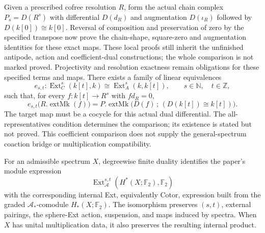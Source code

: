\begin{theorem}
  \label{thm:milnor-coefficient-module-comparison}
  Given a prescribed cofree resolution $R$, form the actual chain complex
  $P_s=D(R^s)$ with differential $D(d_R)$ and augmentation $D(\iota_R)$
  followed by $D(k[0])\cong k[0]$. Reversal of composition and preservation
  of zero by the specified transpose now prove the chain-shape, square-zero
  and augmentation identities for these exact maps. These local proofs still
  inherit the unfinished antipode, action and coefficient-dual constructions;
  the whole comparison is not marked proved. Projectivity and resolution
  exactness remain obligations for these specified terms and maps.
  There exists a family of linear equivalences
  \[
    e_{s,t}:\operatorname{Ext}_C^s(k[t],k)
       \cong\operatorname{Ext}_A^s(k,k[t]),
    \qquad s\in\mathbb N,\quad t\in\mathbb Z,
  \]
  such that, for every $f:k[t]\to R^s$ with $fd_R=0$,
  \[
    e_{s,t}\bigl(R.\operatorname{extMk}(f)\bigr)
      =P.\operatorname{extMk}\bigl(D(f)\,;\,(D(k[t])\cong k[t])\bigr).
  \]
  The target map must be a cocycle for this actual dual differential.
  The all-representatives condition determines the comparison; its
  existence is stated but not proved. This coefficient comparison does not
  supply the general-spectrum coaction bridge or
  multiplication compatibility.
\end{theorem}

\begin{proposition}
  \label{prop:adams-module-comodule-ext-comparison}
  \notready
  For an admissible spectrum $X$, degreewise finite duality identifies the
  paper's module expression
  \[
    \operatorname{Ext}_{\mathcal A}^{s,t}
      (H^*(X;\mathbb F_2),\mathbb F_2)
  \]
  with the corresponding internal Ext, equivalently Cotor, expression built
  from the graded $\mathcal A_*$-comodule $H_*(X;\mathbb F_2)$.  The
  isomorphism preserves $(s,t)$, external pairings, the sphere-Ext action,
  suspension, and maps induced by spectra.  When $X$ has unital multiplication
  data, it also preserves the resulting internal product.
\end{proposition}

